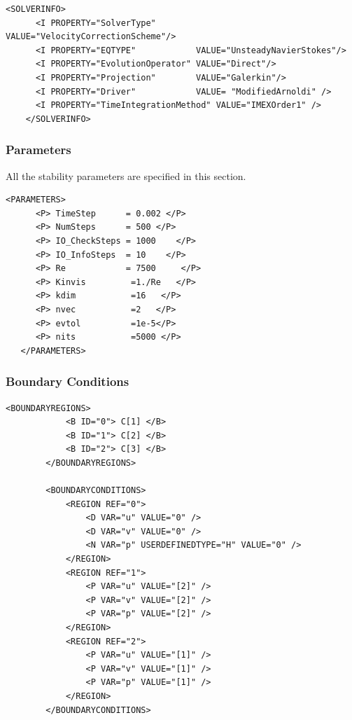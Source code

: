     \begin{lstlisting}[style=XMLStyle]
      <SOLVERINFO>
      <I PROPERTY="SolverType"        VALUE="VelocityCorrectionScheme"/>
      <I PROPERTY="EQTYPE"            VALUE="UnsteadyNavierStokes"/>
      <I PROPERTY="EvolutionOperator" VALUE="Direct"/>
      <I PROPERTY="Projection"        VALUE="Galerkin"/>
      <I PROPERTY="Driver"            VALUE= "ModifiedArnoldi" />
      <I PROPERTY="TimeIntegrationMethod" VALUE="IMEXOrder1" />    
    </SOLVERINFO>
      \end{lstlisting}


\subsubsection{Parameters}

All the stability parameters are specified in this section. 

    \begin{lstlisting}[style=XMLStyle]
<PARAMETERS>
      <P> TimeStep      = 0.002 </P>
      <P> NumSteps      = 500 </P>
      <P> IO_CheckSteps = 1000    </P>
      <P> IO_InfoSteps  = 10    </P>
      <P> Re            = 7500     </P>
      <P> Kinvis         =1./Re   </P>
      <P> kdim           =16   </P>
      <P> nvec           =2   </P>
      <P> evtol          =1e-5</P>
      <P> nits           =5000 </P>
   </PARAMETERS>
         \end{lstlisting}
         
         
\subsubsection{Boundary Conditions}

    \begin{lstlisting}[style=XMLStyle]
 <BOUNDARYREGIONS>
            <B ID="0"> C[1] </B>
            <B ID="1"> C[2] </B>
            <B ID="2"> C[3] </B>
        </BOUNDARYREGIONS>

        <BOUNDARYCONDITIONS>
            <REGION REF="0">
                <D VAR="u" VALUE="0" />
                <D VAR="v" VALUE="0" />
                <N VAR="p" USERDEFINEDTYPE="H" VALUE="0" />
            </REGION>
            <REGION REF="1">
                <P VAR="u" VALUE="[2]" />
                <P VAR="v" VALUE="[2]" />
                <P VAR="p" VALUE="[2]" />
            </REGION>
            <REGION REF="2">
                <P VAR="u" VALUE="[1]" />
                <P VAR="v" VALUE="[1]" />
                <P VAR="p" VALUE="[1]" />
            </REGION>
        </BOUNDARYCONDITIONS>
                 \end{lstlisting}

